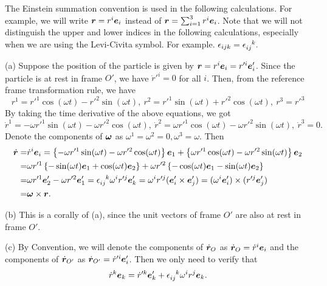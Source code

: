 \documentclass{article}
\begin{document}
\begin{solution}

The Einstein summation convention is used in the following calculations. For example, we will write \(\boldsymbol{r} = r^i \boldsymbol{e}_i\) instead of \(\boldsymbol{r} = \sum_{i=1}^{3} r^i \boldsymbol{e}_i\).
Note that we will not distinguish the upper and lower indices in the following calculations, especially when we are using the Levi-Civita symbol. For example. $ \epsilon_{ijk}=\epsilon\indices{_{ij}^k}. $

(a) Suppose the position of the particle is given by \(\boldsymbol{r} = r^i\boldsymbol{e}_i = r'^i \boldsymbol{e}'_i\). Since the particle is at rest in frame \(O'\), we have \(\dot{r}'^i = 0\) for all \(i\). Then, from the reference frame transformation rule, we have
\[ r^1=r'^1\cos(\omega t)-r'^2\sin(\omega t),\ r^2=r'^1\sin(\omega t)+r'^2\cos(\omega t),\ r^3=r'^3 \tag{6} \]
By taking the time derivative of the above equations, we got
\[ \dot{r}^1=-\omega r'^1\sin(\omega t)-\omega r'^2\cos(\omega t),\ \dot{r}^2=\omega r'^1\cos(\omega t)-\omega r'^2\sin(\omega t),\ \dot{r}^3=0. \]
Denote the components of $ \boldsymbol{\omega} $ as $ \omega^1=\omega^2=0,\omega^3=\omega $.
Then
\begin{align*}
\dot{\bo{r}}=&\dot{r}^i\bo{e}_i=\left\{-\omega r'^1\sin(\omega t)-\omega r'^2\cos(\omega t)\right\}\bo{e}_1 +\left\{\omega r'^1\cos(\omega t)-\omega r'^2\sin(\omega t)\right\}\bo{e}_2\\
=&\omega r'^1\left\{-\sin(\omega t)\bo{e}_1+\cos(\omega t)\bo{e}_2\right\}
+\omega r'^2\left\{-\cos(\omega t)\bo{e}_1-\sin(\omega t)\bo{e}_2\right\}\\
=&\omega r'^1\bo{e}_2'-\omega r'^2\bo{e}_1'=\epsilon\indices{_{ij}^k}\omega^i r'^j\bo{e}_k'=\omega^i r'^j(\bo{e}_i'\times\bo{e}_j')=(\omega^i\bo{e}_i')\times(r'^j\bo{e}_j')\\
=&\bo{\omega}\times \bo{r}.
\end{align*}

(b) This is a corally of (a), since the unit vectors of frame \(O'\) are also at rest in frame \(O'\).

(c) By Convention, we will denote the components of \(\dot{\boldsymbol{r}}_O\) as \(\dot{\boldsymbol{r}}_O=\dot{r}^i\boldsymbol{e}_i\) and the components of \(\dot{\boldsymbol{r}}_{O'}\) as \(\dot{\boldsymbol{r}}_{O'}=\dot{r}^{\prime i}\boldsymbol{e}_i'\). Then we only need to verify that
\[ \dot{r}^k\bo{e}_k=\dot{r}^{\prime k}\bo{e}_k'+\epsilon\indices{_{ij}^k}\omega^i r^j\bo{e}_k. \]


\end{solution}
\end{document}
